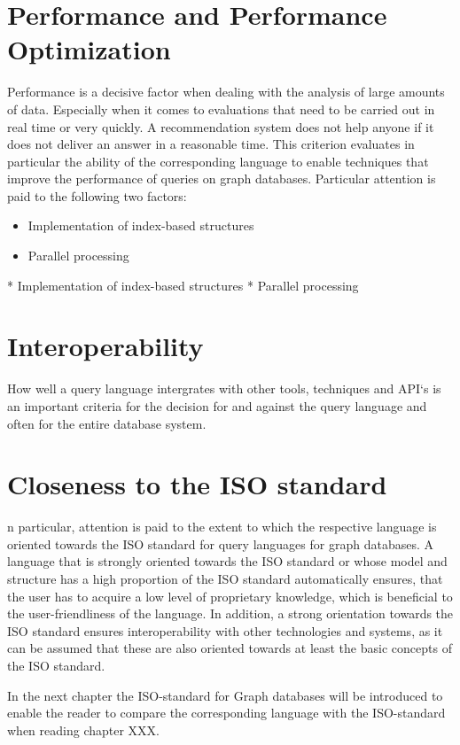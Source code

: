 \section{Performance and Performance Optimization}
Performance is a decisive factor when dealing with the analysis of large amounts of data. 
Especially when it comes to evaluations that need to be carried out in real time or very quickly. 
A recommendation system does not help anyone if it does not deliver an answer in a reasonable time.
This criterion evaluates in particular the ability of the corresponding language to enable techniques 
that improve the performance of queries on graph databases.
Particular attention is paid to the following two factors:
\begin{itemize}
	\item Implementation of index-based structures
	\item Parallel processing
\end{itemize}
* Implementation of index-based structures
* Parallel processing

\section{Interoperability}
How well a query language intergrates with other tools, techniques and API`s is an important
criteria for the decision for and against the query language and often for the entire 
database system.

\section{Closeness to the ISO standard}
n particular, attention is paid to the extent to which the respective language is oriented 
towards the ISO standard for query languages for graph databases.
A language that is strongly oriented towards the ISO standard or whose model and structure 
has a high proportion of the ISO standard automatically ensures, 
that the user has to acquire a low level of proprietary knowledge, 
which is beneficial to the user-friendliness of the language.
In addition, a strong orientation towards the ISO standard ensures interoperability 
with other technologies and systems, 
as it can be assumed that these are also oriented towards at least the basic concepts of the ISO standard.

In the next chapter the ISO-standard for Graph databases will be introduced to enable the reader 
to compare the corresponding language with the ISO-standard when reading chapter XXX.

